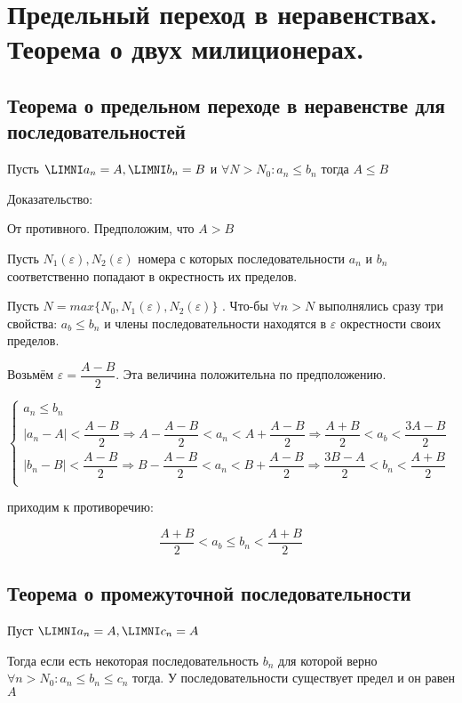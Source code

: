 \section{Предельный переход в неравенствах. Теорема о двух милиционерах.}

\subsection{Теорема о предельном переходе в неравенстве для последовательностей}

Пусть $\LIMNI a_n = A, \LIMNI b_n = B$ и $\forall N > N_0 : a_n \le b_n$ тогда $A \le B$

Доказательство:

От противного. Предположим, что $A > B$

Пусть $N_1(\varepsilon), N_2(\varepsilon)$ номера с которых последовательности $a_n$ и $b_n$ соответственно попадают в окрестность их пределов.

Пусть $N = max\{N_0, N_1(\varepsilon), N_2(\varepsilon)\}$ . Что-бы $\forall n > N$ выполнялись сразу три свойства: $a_b \le b_n$ и члены последовательности находятся в $\varepsilon$ окрестности своих пределов.

Возьмём $\varepsilon = \dfrac{A - B}{2}$. Эта величина положительна по предположению.

$\begin{cases}
a_n \le b_n \\
|a_n - A| < \dfrac{A - B}{2} \Rightarrow A - \dfrac{A - B}{2} < a_n < A + \dfrac{A - B}{2} \Rightarrow \dfrac{A+B}{2} < a_b < \dfrac{3A - B}{2} \\
|b_n - B| < \dfrac{A - B}{2} \Rightarrow B - \dfrac{A - B}{2}< a_n < B + \dfrac{A - B}{2} \Rightarrow \dfrac{3B - A}{2} < b_n < \dfrac{A+B}{2} \\
\end{cases}$

приходим к противоречию:

$$\dfrac{A+B}{2} < a_b \le b_n < \dfrac{A+B}{2}$$ 

\subsection{Теорема о промежуточной последовательности}

Пуст $\LIMNI a_n = A, \LIMNI c_n = A$

Тогда если есть некоторая последовательность $b_n$ для которой верно $\forall n > N_0 : a_n \le b_n \le c_n$ тогда. У последовательности существует предел и он равен $A$

